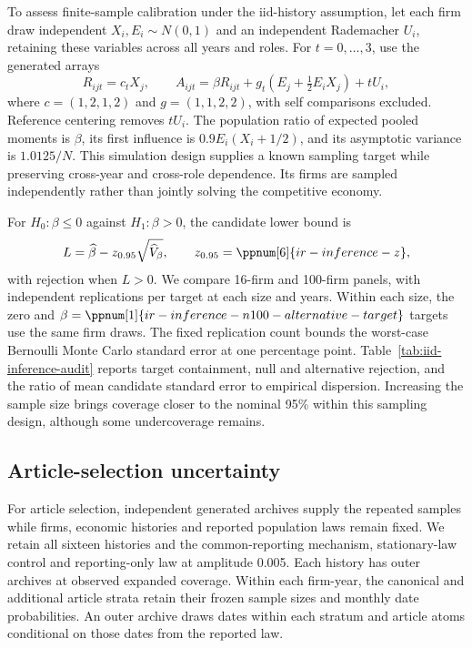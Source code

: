 To assess finite-sample calibration under the iid-history assumption, let
each firm draw independent $X_i,E_i\sim N(0,1)$ and an independent
Rademacher $U_i$, retaining these variables across all years and roles.
For $t=0,\ldots,3$, use the generated arrays
\begin{equation}\label{eq:inference-fixture}
  R_{ijt}=c_t X_j,\qquad
  A_{ijt}=\beta R_{ijt}+g_t(E_j+\tfrac{1}{2}E_i X_j)+tU_i,
\end{equation}
where $c=(1,2,1,2)$ and $g=(1,1,2,2)$, with self comparisons excluded.
Reference centering removes $tU_i$.
The population ratio of expected pooled moments is $\beta$, its first
influence is $0.9E_i(X_i+1/2)$, and its asymptotic variance is $1.0125/N$.
This simulation design supplies a known sampling target while preserving
cross-year and cross-role dependence.
Its firms are sampled independently rather than jointly solving the
competitive economy.

For $H_0:\beta\leq0$ against $H_1:\beta>0$, the candidate lower bound is
\begin{equation}\label{eq:one-sided-candidate}
  L=\widehat\beta-z_{0.95}\sqrt{\widehat V_\beta},\qquad
  z_{0.95}=\ppnum[6]{ir-inference-z},
\end{equation}
with rejection when $L>0$.
We compare 16-firm and 100-firm panels, with
 independent replications per
target at each size and  years.
Within each size, the zero and
$\beta=\ppnum[1]{ir-inference-n100-alternative-target}$ targets use the
same firm draws.
The fixed replication count bounds the worst-case Bernoulli Monte Carlo
standard error at one percentage point.
Table~\ref{tab:iid-inference-audit} reports target containment, null and
alternative rejection, and the ratio of mean candidate standard error to
empirical dispersion.
Increasing the sample size brings coverage closer to the nominal 95\%
within this sampling design, although some undercoverage remains.



\subsection{Article-selection uncertainty}\label{app:article-selection}

For article selection, independent generated archives supply the repeated
samples while firms, economic histories and reported population laws remain
fixed.
We retain all sixteen histories and the common-reporting mechanism,
stationary-law control and reporting-only law at amplitude 0.005.
Each history has  outer archives
at observed expanded coverage.
Within each firm-year, the canonical and additional article strata retain
their frozen sample sizes and monthly date probabilities.
An outer archive draws dates within each stratum and article atoms conditional
on those dates from the reported law.

